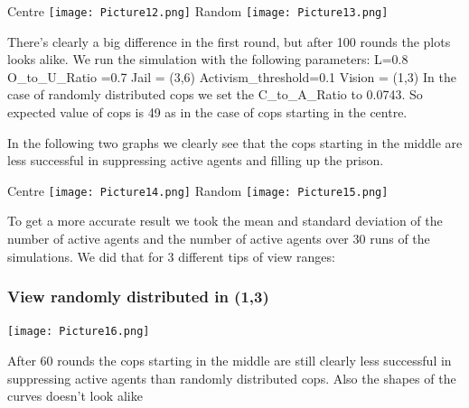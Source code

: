 \documentclass[11pt]{article}
\begin{document}
Centre\newline\newline
\texttt{[image: Picture12.png]}\newpage
Random\newline\newline
\texttt{[image: Picture13.png]}\newline


There's clearly a big difference in the first round, but after 100 rounds the plots looks alike. \newline
We run the simulation with the following parameters: \newline
L=0.8\newline
O\_to\_U\_Ratio =0.7\newline
Jail = (3,6)\newline
Activism\_threshold=0.1\newline
Vision = (1,3)\newline
In the case of randomly distributed cops we set the C\_to\_A\_Ratio to 0.0743. So expected value of cops is 49 as in the case of cops starting in the centre.\newline\newline

In the following two graphs we clearly see that the cops starting in the middle are less successful in suppressing active agents and filling up the prison.\newline\newpage

Centre\newline
\texttt{[image: Picture14.png]}\newline
Random\newline
\texttt{[image: Picture15.png]}\newline

To get a more accurate result we took the mean and standard deviation of the number of active agents and the number of active agents over 30 runs of the simulations. We did that for 3 different tips of view ranges:\newline\newline

\subsubsection{View randomly distributed in (1,3)}

\texttt{[image: Picture16.png]}

After 60 rounds the cops starting in the middle are still clearly less successful in suppressing active agents than randomly distributed cops. Also the shapes of the curves doesn’t look alike\newline\newline
\end{document}
